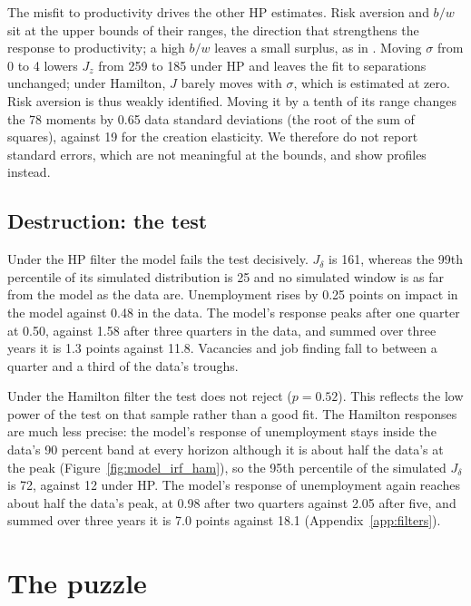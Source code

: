 \documentclass[authoryear, review, 12pt]{elsarticle}
\begin{document}
The misfit to productivity drives the other HP estimates. Risk aversion and $b/w$ sit at the upper bounds of their ranges, the direction that strengthens the response to productivity; a high $b/w$ leaves a small surplus, as in \citet{hagedorn_2008}. Moving $\sigma$ from 0 to 4 lowers $J_z$ from 259 to 185 under HP and leaves the fit to separations unchanged; under Hamilton, $J$ barely moves with $\sigma$, which is estimated at zero. Risk aversion is thus weakly identified. Moving it by a tenth of its range changes the 78 moments by 0.65 data standard deviations (the root of the sum of squares), against 19 for the creation elasticity. We therefore do not report standard errors, which are not meaningful at the bounds, and show profiles instead.

\subsection{Destruction: the test}

Under the HP filter the model fails the test decisively. $J_\delta$ is 161, whereas the 99th percentile of its simulated distribution is 25 and no simulated window is as far from the model as the data are. Unemployment rises by 0.25 points on impact in the model against 0.48 in the data. The model's response peaks after one quarter at 0.50, against 1.58 after three quarters in the data, and summed over three years it is 1.3 points against 11.8. Vacancies and job finding fall to between a quarter and a third of the data's troughs.

Under the Hamilton filter the test does not reject ($p=0.52$). This reflects the low power of the test on that sample rather than a good fit. The Hamilton responses are much less precise: the model's response of unemployment stays inside the data's 90 percent band at every horizon although it is about half the data's at the peak (Figure~\ref{fig:model_irf_ham}), so the 95th percentile of the simulated $J_\delta$ is 72, against 12 under HP. The model's response of unemployment again reaches about half the data's peak, at 0.98 after two quarters against 2.05 after five, and summed over three years it is 7.0 points against 18.1 (Appendix~\ref{app:filters}).

\section{The puzzle}\label{sec:puzzle}
\end{document}
